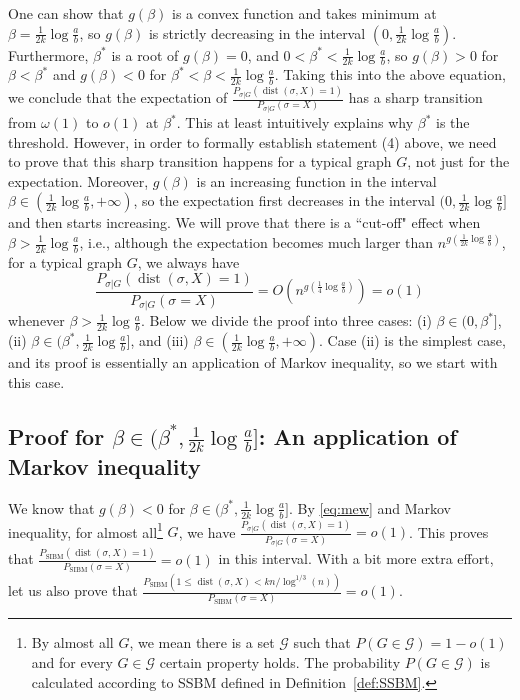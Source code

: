 \documentclass[conference]{IEEEtran}
\DeclareMathOperator{\SIBM}{SIBM}
\newcommand{\cG}{\mathcal{G}}
\DeclareMathOperator{\dist}{dist}
\begin{document}
One can show that $g(\beta)$ is a convex function and takes minimum at $\beta=\frac{1}{2k}\log\frac{a}{b}$, so $g(\beta)$ is strictly decreasing in the interval $(0,\frac{1}{2k}\log\frac{a}{b})$. Furthermore, $\beta^\ast$ is a root of $g(\beta)=0$, and $0<\beta^\ast<\frac{1}{2k}\log\frac{a}{b}$, so $g(\beta)>0$ for $\beta<\beta^\ast$ and $g(\beta)<0$ for $\beta^\ast<\beta<\frac{1}{2k}\log\frac{a}{b}$.
Taking this into the above equation, we conclude that the expectation of $\frac{P_{\sigma|G} ( \dist(\sigma, X) = 1 )}{P_{\sigma|G}(\sigma= X)}$ has a sharp transition from $\omega(1)$ to $o(1)$ at $\beta^\ast$.
This at least intuitively explains why $\beta^\ast$ is the threshold. However, in order to formally establish statement (4) above, we need to prove that this sharp transition happens for a typical graph $G$, not just for the expectation.
Moreover, $g(\beta)$ is an increasing function in the interval $\beta\in(\frac{1}{2k}\log\frac{a}{b}, +\infty)$, so the expectation first decreases in the interval $(0,\frac{1}{2k}\log\frac{a}{b}]$ and then starts increasing. We will prove that there is a ``cut-off" effect when $\beta>\frac{1}{2k}\log\frac{a}{b}$, i.e., although the expectation becomes much larger than $n^{g(\frac{1}{2k}\log\frac{a}{b})}$, for a typical graph $G$, we always have
$$
\frac{P_{\sigma|G} ( \dist(\sigma, X) = 1 )}{P_{\sigma|G}(\sigma= X)} 
= O( n^{g(\frac{1}{4}\log\frac{a}{b})} ) =o(1)
$$
whenever $\beta>\frac{1}{2k}\log\frac{a}{b}$.
Below we divide the proof into three cases: (i) $\beta\in(0,\beta^\ast]$, (ii) $\beta\in(\beta^\ast,\frac{1}{2k}\log\frac{a}{b}]$, and (iii) $\beta\in(\frac{1}{2k}\log\frac{a}{b},+\infty)$.
Case (ii) is the simplest case, and its proof is essentially an application of Markov inequality, so we start with this case.

\subsection{Proof for $\beta\in(\beta^\ast,\frac{1}{2k}\log\frac{a}{b}]$: An application of Markov inequality}
\label{sect:simreg}

We know that $g(\beta)<0$ for $\beta\in(\beta^\ast,\frac{1}{2k}\log\frac{a}{b}]$. By \eqref{eq:mew} and Markov inequality, for almost all\footnote{By almost all $G$, we mean there is a set $\cG$ such that $P(G\in\cG)=1-o(1)$ and for every $G\in\cG$ certain property holds. The probability $P(G\in\cG)$ is calculated according to SSBM defined in Definition~\ref{def:SSBM}.} $G$, we have $\frac{P_{\sigma|G} ( \dist(\sigma, X) = 1 )}{P_{\sigma|G}(\sigma= X)}=o(1)$. This proves that $\frac{P_{\SIBM} ( \dist(\sigma, X) = 1 )}{P_{\SIBM}(\sigma= X)}=o(1)$ in this interval. With a bit more extra effort, let us also prove that $\frac{P_{\SIBM} ( 1\le \dist(\sigma, X)< kn/\log^{1/3}(n) )}{P_{\SIBM}(\sigma= X)}=o(1)$.
\end{document}
